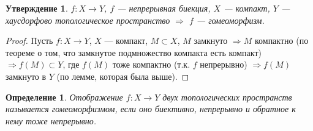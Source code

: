 \documentclass[12pt]{article}
\theoremstyle{plain}
\newtheorem{subtheorem}{Утверждение}[section]
\newtheorem{definition}{Определение}[section]
\begin{document}
    \begin{subtheorem}
        $f: X \to Y$, $f$ — непрерывная биекция, $X$ — компакт, $Y$ — хаусдорфово топологическое пространство $\Longrightarrow$ $f$ — гомеоморфизм.
    \end{subtheorem}
    \begin{proof}
        Пусть $f: X \to Y$, $X$ — компакт, $M \subset X$, $M$ замкнуто $\Longrightarrow M$ компактно (по теореме о том, что замкнутое подмножество компакта есть компакт) $\Longrightarrow f(M) \subset Y$, где $f(M)$ тоже компактно (т.к. $f$ непрерывно) $\Longrightarrow f(M)$ замкнуто в $Y$ (по лемме, которая была выше). 
    \end{proof}
    \begin{definition}
        Отображение $f:X\to Y$ двух топологических пространств называется гомеоморфизмом, если оно биективно, непрерывно и обратное к нему тоже непрерывно.
    \end{definition}
\end{document}
